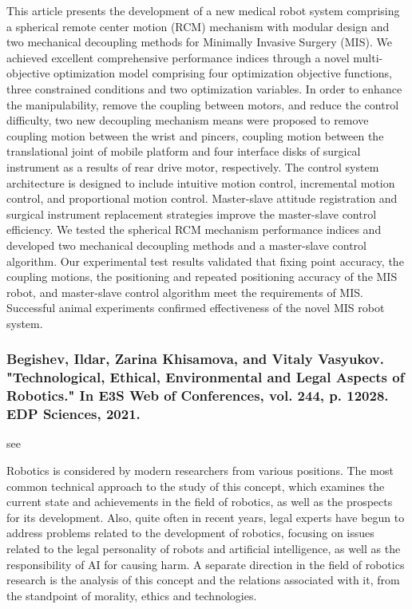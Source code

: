 \documentclass[conference]{IEEEtran}
\begin{document}
This article presents the development of a new medical robot system comprising a spherical remote center motion (RCM) mechanism with modular design and two mechanical decoupling methods for Minimally Invasive Surgery (MIS). We achieved excellent comprehensive performance indices through a novel multi-objective optimization model comprising four optimization objective functions, three constrained conditions and two optimization variables. In order to enhance the manipulability, remove the coupling between motors, and reduce the control difficulty, two new decoupling mechanism means were proposed to remove coupling motion between the wrist and pincers, coupling motion between the translational joint of mobile platform and four interface disks of surgical instrument as a results of rear drive motor, respectively. The control system architecture is designed to include intuitive motion control, incremental motion control, and proportional motion control. Master-slave attitude registration and surgical instrument replacement strategies improve the master-slave control efficiency. We tested the spherical RCM mechanism performance indices and developed two mechanical decoupling methods and a master-slave control algorithm. Our experimental test results validated that fixing point accuracy, the coupling motions, the positioning and repeated positioning accuracy of the MIS robot, and master-slave control algorithm meet the requirements of MIS. Successful animal experiments confirmed effectiveness of the novel MIS robot system.

\medskip
\subsubsection{Begishev, Ildar, Zarina Khisamova, and Vitaly Vasyukov. "Technological, Ethical, Environmental and Legal Aspects of Robotics." In E3S Web of Conferences, vol. 244, p. 12028. EDP Sciences, 2021.}
see \cite{begishev2021technological}

Robotics is considered by modern researchers from various positions. The most common technical approach to the study of this concept, which examines the current state and achievements in the field of robotics, as well as the prospects for its development. Also, quite often in recent years, legal experts have begun to address problems related to the development of robotics, focusing on issues related to the legal personality of robots and artificial intelligence, as well as the responsibility of AI for causing harm. A separate direction in the field of robotics research is the analysis of this concept and the relations associated with it, from the standpoint of morality, ethics and technologies.
\end{document}
